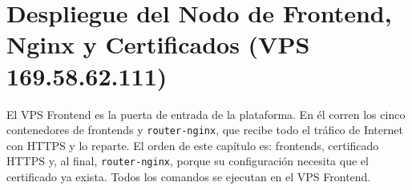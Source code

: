 \section{Despliegue del Nodo de Frontend, Nginx y Certificados (VPS 169.58.62.111)}\label{cap:07_despliegue_frontend_nginx}
El VPS Frontend es la puerta de entrada de la plataforma. En él corren los cinco contenedores de frontends y \texttt{router-nginx}, que recibe todo el tráfico de Internet con HTTPS y lo reparte. El orden de este capítulo es: frontends, certificado HTTPS y, al final, \texttt{router-nginx}, porque su configuración necesita que el certificado ya exista. Todos los comandos se ejecutan en el VPS Frontend.





